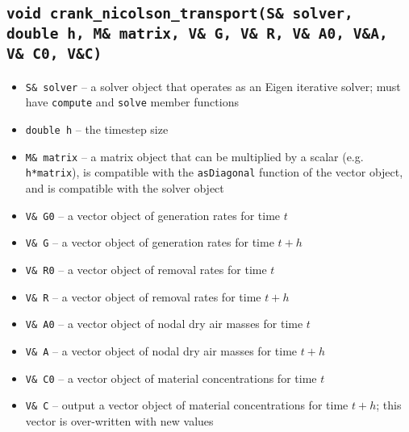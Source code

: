 \documentclass[10pt]{report}
\begin{document}
\subsection{\texttt{void crank\_nicolson\_transport(S\& solver, double h, M\& matrix, V\& G, V\& R, V\& A0, V\&A, V\& C0, V\&C)}}
\begin{itemize}
\item \texttt{S\& solver} -- a solver object that operates as an Eigen iterative solver; must have \texttt{compute} and \texttt{solve} member functions
\item \texttt{double h} -- the timestep size
\item \texttt{M\& matrix} -- a matrix object that can be multiplied by a scalar (e.g. \texttt{h*matrix}), is compatible with the \texttt{asDiagonal} function of the vector object, and is compatible with the solver object
\item \texttt{V\& G0} -- a vector object of generation rates for time $t$
\item \texttt{V\& G} -- a vector object of generation rates for time $t+h$
\item \texttt{V\& R0} -- a vector object of removal rates for time $t$
\item \texttt{V\& R} -- a vector object of removal rates for time $t+h$
\item \texttt{V\& A0} -- a vector object of nodal dry air masses for time $t$
\item \texttt{V\& A} -- a vector object of nodal dry air masses for time $t+h$
\item \texttt{V\& C0} -- a vector object of material concentrations for time $t$
\item \texttt{V\& C} -- output a vector object of material concentrations for time $t+h$; this vector is over-written with new values
\end{itemize}
\end{document}
